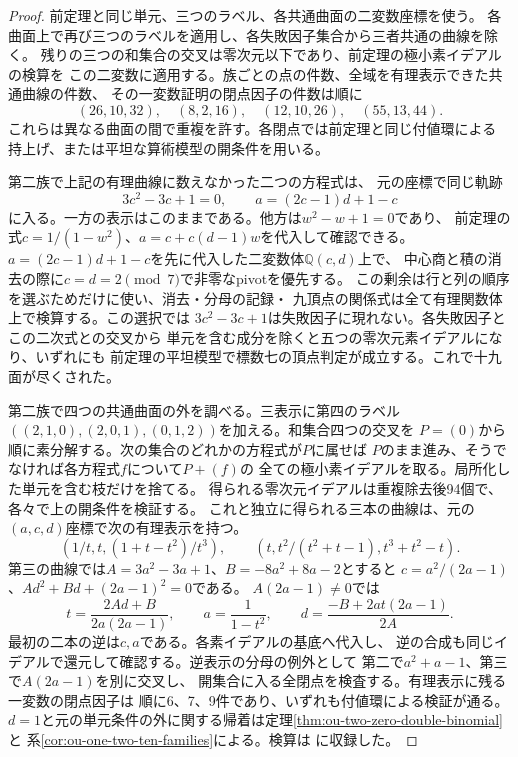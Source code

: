 \begin{proof}
前定理と同じ単元、三つのラベル、各共通曲面の二変数座標を使う。
各曲面上で再び三つのラベルを適用し、各失敗因子集合から三者共通の曲線を除く。
残りの三つの和集合の交叉は零次元以下であり、前定理の極小素イデアルの検算を
この二変数に適用する。族ごとの点の件数、全域を有理表示できた共通曲線の件数、
その一変数証明の閉点因子の件数は順に
\[
 (26,10,32),\quad (8,2,16),\quad (12,10,26),\quad(55,13,44).
\]
これらは異なる曲面の間で重複を許す。各閉点では前定理と同じ付値環による
持上げ、または平坦な算術模型の開条件を用いる。

第二族で上記の有理曲線に数えなかった二つの方程式は、
元の座標で同じ軌跡
\[
 3c^2-3c+1=0,\qquad a=(2c-1)d+1-c
\]
に入る。一方の表示はこのままである。他方は$w^2-w+1=0$であり、
前定理の式$c=1/(1-w^2)$、$a=c+c(d-1)w$を代入して確認できる。
$a=(2c-1)d+1-c$を先に代入した二変数体$\mathbb Q(c,d)$上で、
中心商と積の消去の際に$c=d=2\pmod 7$で非零なpivotを優先する。
この剰余は行と列の順序を選ぶためだけに使い、消去・分母の記録・
九頂点の関係式は全て有理関数体上で検算する。この選択では
$3c^2-3c+1$は失敗因子に現れない。各失敗因子とこの二次式との交叉から
単元を含む成分を除くと五つの零次元素イデアルになり、いずれにも
前定理の平坦模型で標数七の頂点判定が成立する。これで十九面が尽くされた。

第二族で四つの共通曲面の外を調べる。三表示に第四のラベル
$((2,1,0),(2,0,1),(0,1,2))$を加える。和集合四つの交叉を
$P=(0)$から順に素分解する。次の集合のどれかの方程式が$P$に属せば
$P$のまま進み、そうでなければ各方程式$f$について$P+(f)$の
全ての極小素イデアルを取る。局所化した単元を含む枝だけを捨てる。
得られる零次元イデアルは重複除去後94個で、各々で上の開条件を検証する。
これと独立に得られる三本の曲線は、元の$(a,c,d)$座標で次の有理表示を持つ。
\[
 (1/t,t,(1+t-t^2)/t^3),\qquad
 (t,t^2/(t^2+t-1),t^3+t^2-t).
\]
第三の曲線では$A=3a^2-3a+1$、$B=-8a^2+8a-2$とすると
$c=a^2/(2a-1)$、$A d^2+B d+(2a-1)^2=0$である。
$A(2a-1)\ne0$では
\[
 t=\frac{2Ad+B}{2a(2a-1)},\qquad
 a=\frac1{1-t^2},\qquad d=\frac{-B+2at(2a-1)}{2A}.
\]
最初の二本の逆は$c,a$である。各素イデアルの基底へ代入し、
逆の合成も同じイデアルで還元して確認する。逆表示の分母の例外として
第二で$a^2+a-1$、第三で$A(2a-1)$を別に交叉し、
開集合に入る全閉点を検査する。有理表示に残る一変数の閉点因子は
順に6、7、9件であり、いずれも付値環による検証が通る。
$d=1$と元の単元条件の外に関する帰着は定理\ref{thm:ou-two-zero-double-binomial}と
系\ref{cor:ou-one-two-ten-families}による。検算は
に収録した。
\end{proof}

